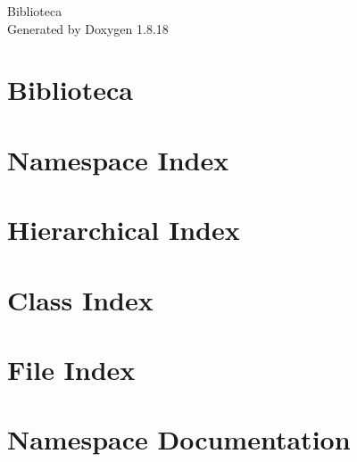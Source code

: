 \let\mypdfximage\pdfximage\def\pdfximage{\immediate\mypdfximage}\documentclass[twoside]{book}
\newcommand{\+}{\discretionary{\mbox{\scriptsize$\hookleftarrow$}}{}{}}
\newcommand{\clearemptydoublepage}{%
  \newpage{\pagestyle{empty}\cleardoublepage}%
}
\begin{document}
\hypersetup{pageanchor=false,
             bookmarksnumbered=true,
             pdfencoding=unicode
            }
\begin{titlepage}
\vspace*{7cm}
\begin{center}%
{\Large Biblioteca }\\
\vspace*{1cm}
{\large Generated by Doxygen 1.8.18}\\
\end{center}
\end{titlepage}
\clearemptydoublepage
{}
\tableofcontents
\clearemptydoublepage
{}
\hypersetup{pageanchor=true}

\chapter{Biblioteca}
\label{md__c_1__users_isanr_git_biblioteca__r_e_a_d_m_e}

\chapter{Namespace Index}

\chapter{Hierarchical Index}

\chapter{Class Index}

\chapter{File Index}

\chapter{Namespace Documentation}
















\end{document}
